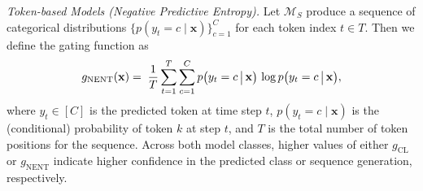 \emph{Token-based Models (Negative Predictive Entropy).} 
Let \(\mathcal{M}_S\) produce a sequence of categorical distributions 
\(\{p(y_t = c \mid \mathbf{x})\}_{c=1}^C\) for each token index \(t \in T\). Then we define the gating function as
\begin{equation}
\footnotesize
g_{\text{NENT}}(\mathbf{x}) 
= \; \frac{1}{T} \sum_{t=1}^{T} \sum_{c=1}^{C} 
    p\bigl(y_t = c \,\big\vert\, \mathbf{x}\bigr)\,\log p\bigl(y_t = c \,\big\vert\, \mathbf{x}\bigr),
\end{equation}
where \(y_t \in [C]\) is the predicted token at time step \(t\), \(p(y_t=c \mid \mathbf{x})\) is the (conditional) probability of token \(k\) at step \(t\), and \(T\) is the total number of token positions for the sequence. Across both model classes, higher values of either $g_{\text{CL}}$ or $g_{\text{NENT}}$ indicate higher confidence in the predicted class or sequence generation, respectively.